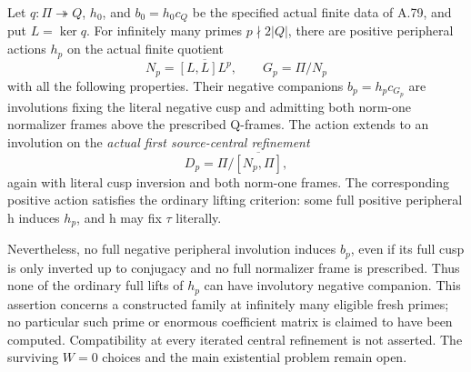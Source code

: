 Let \(q:\Pi\twoheadrightarrow Q\), \(h_0\), and
\(b_0=h_0c_Q\) be the specified actual finite data of A.79,
and put \(L=\ker q\). For infinitely many primes
\(p\nmid2|Q|\), there are positive peripheral actions
\(h_p\) on the actual finite quotient
\[
 N_p=\overline{[L,L]L^p},\qquad G_p=\Pi/N_p
 \tag{A.81.1}
\]
with all the following properties. Their negative companions
\(b_p=h_pc_{G_p}\) are involutions fixing the literal
negative cusp and admitting both norm-one normalizer frames
above the prescribed Q-frames. The action extends to an
involution on the \emph{actual first source-central refinement}
\[
                         D_p=\Pi/\overline{[N_p,\Pi]},
 \tag{A.81.2}
\]
again with literal cusp inversion and both norm-one frames.
The corresponding positive action satisfies the ordinary
lifting criterion: some full positive peripheral h induces
\(h_p\), and h may fix \(\tau\) literally.

Nevertheless, no full negative peripheral involution induces
\(b_p\), even if its full cusp is only inverted up to
conjugacy and no full normalizer frame is prescribed. Thus
none of the ordinary full lifts of \(h_p\) can have
involutory negative companion. This assertion concerns a
constructed family at infinitely many eligible fresh primes;
no particular such prime or enormous coefficient matrix is
claimed to have been computed. Compatibility at every
iterated central refinement is not asserted. The surviving
\(W=0\) choices and the main existential problem remain open.


